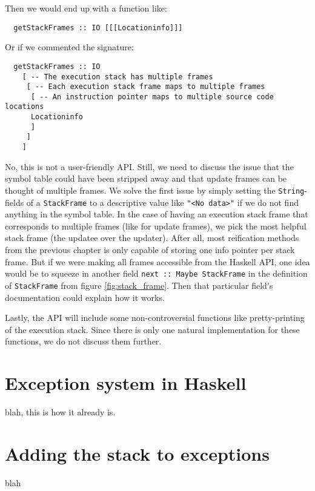 Then we would end up with a function like:

\begin{verbatim}
  getStackFrames :: IO [[[Locationinfo]]]
\end{verbatim}

Or if we commented the signature:

\begin{verbatim}
  getStackFrames :: IO
    [ -- The execution stack has multiple frames
     [ -- Each execution stack frame maps to multiple frames
      [ -- An instruction pointer maps to multiple source code locations
      Locationinfo
      ]
     ]
    ]
\end{verbatim}

No, this is not a user-friendly API. Still, we need to discuss the issue
that the symbol table could have been stripped away and that update
frames can be thought of multiple frames. We solve the first issue by
simply setting the \texttt{String}-fields of a \texttt{StackFrame} to
a descriptive value like \texttt{"<No data>"} if we do not find anything
in the symbol table. In the case of having an
execution stack frame that corresponds to multiple
frames (like for update frames), we pick the most helpful stack frame
(the updatee over the updater).
After all, most reification methods from the previous chapter is only
capable of storing one info pointer per stack frame. But if we were
making all frames accessible from the Haskell API, one idea would be
to squeeze in another field \texttt{next :: Maybe StackFrame} in the
definition of \texttt{StackFrame} from figure \ref{fig:stack_frame}.
Then that particular field's documentation could explain how it works.

Lastly, the API will include some non-controversial functions like
pretty-printing of the execution stack.  Since there is only one natural
implementation for these functions, we do not discuss them further.

\section{Exception system in Haskell}

blah, this is how it already is.

\section{Adding the stack to exceptions}

blah

